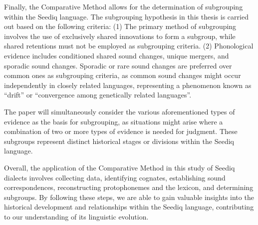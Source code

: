 Finally, the Comparative Method allows for the determination of subgrouping within the Seediq language. The subgrouping hypothesis in this thesis is carried out based on the following criteria: (1) The primary method of subgrouping involves the use of exclusively shared innovations to form a subgroup, while shared retentions must not be employed as subgrouping criteria. (2) Phonological evidence includes conditioned shared sound changes, unique mergers, and sporadic sound changes. Sporadic or rare sound changes are preferred over common ones as subgrouping criteria, as common sound changes might occur independently in closely related languages, representing a phenomenon known as ``drift'' or ``convergence among genetically related languages''.


The paper will simultaneously consider the various aforementioned types of evidence as the basis for subgrouping, as situations might arise where a combination of two or more types of evidence is needed for judgment. These subgroups represent distinct historical stages or divisions within the Seediq language.

Overall, the application of the Comparative Method in this study of Seediq dialects involves collecting data, identifying cognates, establishing sound correspondences, reconstructing protophonemes and the lexicon, and determining subgroups. By following these steps, we are able to gain valuable insights into the historical development and relationships within the Seediq language, contributing to our understanding of its linguistic evolution.

